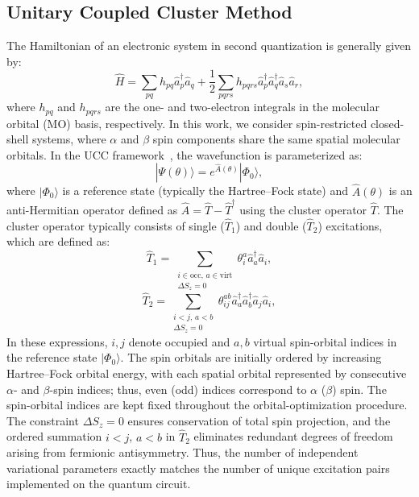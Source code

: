 \documentclass[
 reprint,
 amsmath,amssymb,
 aps,
 physrev,
]{revtex4-2}
\begin{document}
\subsection{Unitary Coupled Cluster Method}
%
The Hamiltonian of an electronic system in second quantization is generally given by:
\begin{equation}
    \label{eq:hamiltonian}
    \hat{H} = \sum_{pq} h_{pq} \hat{a}_p^\dagger \hat{a}_q + \frac{1}{2} \sum_{pqrs} h_{pqrs} \hat{a}_p^\dagger \hat{a}_q^\dagger \hat{a}_s \hat{a}_r,
\end{equation}
where \( h_{pq} \) and \( h_{pqrs} \) are the one- and two-electron integrals in the molecular orbital (MO) basis, respectively.
In this work, we consider spin-restricted closed-shell systems, where \( \alpha \) and \( \beta \) spin components share the same spatial molecular orbitals.
In the UCC framework~\cite{romero2019}, the wavefunction is parameterized as:
\begin{equation}
    \label{eq:ucc_wavefunction}
    |\Psi(\theta)\rangle = e^{\hat{A}(\theta)} |\Phi_0\rangle,
\end{equation}
where \( |\Phi_0\rangle  \) is a reference state (typically the Hartree--Fock state) and \( \hat{A}(\theta) \) is an anti-Hermitian operator defined as \( \hat{A} = \hat{T} - \hat{T}^\dagger  \) using the cluster operator \( \hat{T} \).
The cluster operator typically consists of single (\( \hat{T}_1 \)) and double (\( \hat{T}_2 \)) excitations, which are defined as:
%
\begin{equation}
    \label{eq:T1}
    \hat{T}_1 = \sum_{\substack{i \in \mathrm{occ},\, a \in \mathrm{virt} \\ \Delta S_z = 0}}
    \theta_i^a \hat{a}_a^\dagger \hat{a}_i,
\end{equation}
%
\begin{equation}
    \label{eq:T2}
    \hat{T}_2 = \sum_{\substack{i < j,\, a < b \\ \Delta S_z = 0}}
    \theta_{ij}^{ab} \hat{a}_a^\dagger \hat{a}_b^\dagger \hat{a}_j \hat{a}_i,
\end{equation}
%
In these expressions, \(i,j\) denote occupied and \(a,b\) virtual spin-orbital indices in the reference state \(|\Phi_0\rangle\).
\color{black}
The spin orbitals are initially ordered by increasing Hartree--Fock orbital energy, with each spatial orbital represented by consecutive \(\alpha\)- and \(\beta\)-spin indices; thus, even (odd) indices correspond to \(\alpha\) (\(\beta\)) spin. The spin-orbital indices are kept fixed throughout the orbital-optimization procedure.
\color{black}
The constraint \( \Delta S_z = 0 \) ensures conservation of total spin projection, and the ordered summation \( i < j \), \( a < b \) in \( \hat{T}_2 \) eliminates redundant degrees of freedom arising from fermionic antisymmetry. Thus, the number of independent variational parameters exactly matches the number of unique excitation pairs implemented on the quantum circuit.
\end{document}
